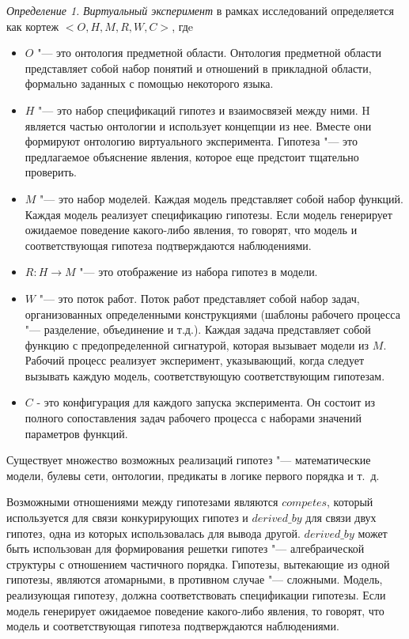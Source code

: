 \textit{Определение 1.} \textit{Виртуальный эксперимент} в рамках исследований определяется как 
кортеж $<O, H, M, R, W, C>$, гдe
\begin{itemize}
    \item $O$ "--- это онтология предметной области. Онтология предметной области представляет собой набор понятий и 
            отношений в прикладной области, формально заданных с помощью некоторого языка.
    \item $H$ "--- это набор спецификаций гипотез и взаимосвязей между ними. H является частью онтологии и использует 
            концепции из нее. Вместе они формируют онтологию виртуального эксперимента. Гипотеза "--- это предлагаемое 
            объяснение явления, которое еще предстоит тщательно проверить. 
    \item $M$ "--- это набор моделей. Каждая модель представляет собой набор функций. Каждая модель реализует 
            спецификацию гипотезы. Если модель генерирует ожидаемое поведение какого-либо явления, то говорят, что 
            модель и соответствующая гипотеза подтверждаются наблюдениями.
    \item $R: H \to M$ "--- это отображение из набора гипотез в модели.
    \item $W$ "--- это поток работ. Поток работ представляет собой набор задач, организованных определенными 
            конструкциями (шаблоны рабочего процесса "--- разделение, объединение и т.д.). Каждая задача представляет 
            собой функцию с предопределенной сигнатурой, которая вызывает модели из $M$. Рабочий процесс реализует 
            эксперимент, указывающий, когда следует вызывать каждую модель, соответствующую соответствующим гипотезам. 
    \item $C$ - это конфигурация для каждого запуска эксперимента. Он состоит из полного сопоставления задач 
            рабочего процесса с наборами значений параметров функций.
\end{itemize}

Существует множество возможных реализаций гипотез "--- математические модели, булевы сети, онтологии, предикаты в 
логике первого порядка и т.~д.

Возможными отношениями между гипотезами являются $competes$, который используется для связи конкурирующих гипотез 
и $derived\_by$ для связи двух гипотез, одна из которых использовалась для вывода другой. $derived\_by$ может быть 
использован для формирования решетки гипотез "--- алгебраической структуры с отношением частичного порядка. 
Гипотезы, вытекающие из одной гипотезы, являются атомарными, в противном случае "--- сложными. 
Модель, реализующая гипотезу, должна соответствовать спецификации гипотезы. Если модель генерирует ожидаемое поведение 
какого-либо явления, то говорят, что модель и соответствующая гипотеза подтверждаются наблюдениями.



